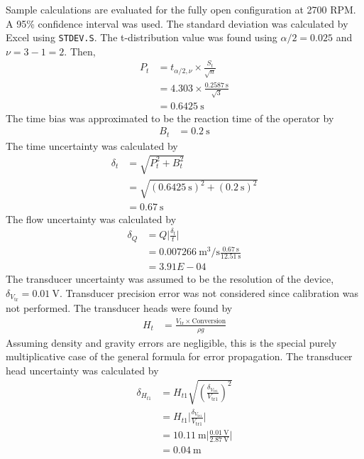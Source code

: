 Sample calculations are evaluated for the fully open configuration at 2700 RPM. A 95\% confidence interval was used. The standard deviation was calculated by Excel using \texttt{STDEV.S}. The t-distribution value was found using $\alpha/2 = 0.025$ and $\nu = 3 - 1 = 2$. Then,
\begin{align*}
    P_t &= t_{\alpha/2, \nu} \times \frac{S_t}{\sqrt{n}} \\
    &= 4.303 \times \frac{\qty{0.2587}{\second}}{\sqrt{3}} \\
    &= \qty{0.6425}{\second}
\end{align*}
The time bias was approximated to be the reaction time of the operator by
\begin{align*}
    B_t &= \qty{0.2}{\second}
\end{align*}
The time uncertainty was calculated by
\begin{align*}
    \delta_t &= \sqrt{P_t^2 + B_t^2} \\
    &= \sqrt{(\qty{0.6425}{\second})^2 + (\qty{0.2}{\second})^2} \\
    &= \qty{0.67}{\second}
\end{align*}
The flow uncertainty was calculated by
\begin{align*}
    \delta_Q &= Q \bigg|\frac{\delta_t}{t}\bigg| \\
    &= \qty{0.007266}{\meter\cubed\per\second} \frac{\qty{0.67}{\second}}{\qty{12.51}{\second}} \\
    &= 3.91E-04
\end{align*}
The transducer uncertainty was assumed to be the resolution of the device, $\delta_{V_{\text{tr}}} = \qty{0.01}{\volt}$. Transducer precision error was not considered since calibration was not performed. The transducer heads were found by
\begin{align*}
    H_t &= \frac{V_{\text{tr}} \times \text{Conversion}}{\rho g} 
\end{align*}
Assuming density and gravity errors are negligible, this is the special purely multiplicative case of the general formula for error propagation. The transducer head uncertainty was calculated by
\begin{align*}
    \delta_{H_{t1}} &= H_{t1} \sqrt{\left(\frac{\delta_{V_{\text{tr1}}}}{V_{\text{tr1}}}\right)^2} \\
    &= H_{t1} \bigg|\frac{\delta_{V_{\text{tr1}}}}{V_{\text{tr1}}}\bigg| \\
    &= \qty{10.11}{\meter} \bigg|\frac{\qty{0.01}{\volt}}{\qty{2.87}{\volt}}\bigg| \\
    &= \qty{0.04}{\meter}
\end{align*}
